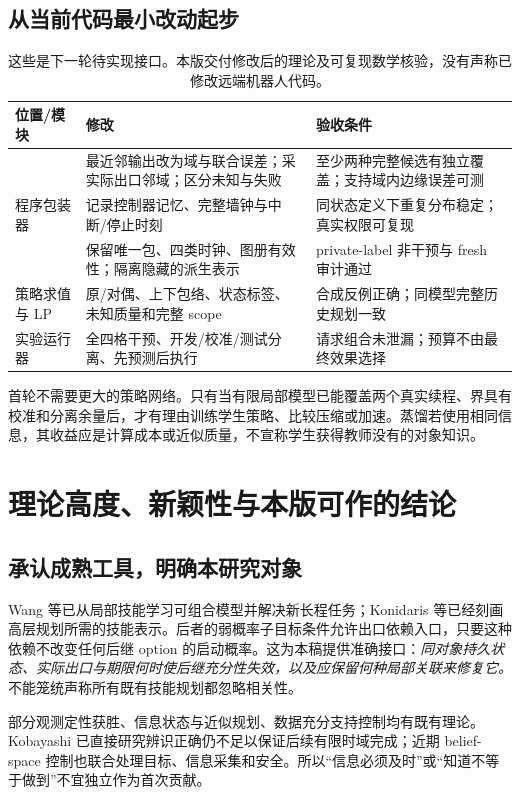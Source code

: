 \documentclass[11pt,a4paper,fontset=fandol]{ctexart}
\theoremstyle{definition}
\theoremstyle{remark}\newtheorem{remark}[theorem]{说明}
\numberwithin{equation}{section}
\begin{document}
\subsection{从当前代码最小改动起步}
\begin{table}[htbp]\centering\small
\begin{tabularx}{\linewidth}{P{.24\linewidth}YY}\toprule
位置/模块 & 修改 & 验收条件\\\midrule
{} & 最近邻输出改为域与联合误差；采实际出口邻域；区分未知与失败 & 至少两种完整候选有独立覆盖；支持域内边缘误差可测\\
程序包装器 & 记录控制器记忆、完整墙钟与中断/停止时刻 & 同状态定义下重复分布稳定；真实权限可复现\\
 & 保留唯一包、四类时钟、图册有效性；隔离隐藏的派生表示 & private-label 非干预与 fresh 审计通过\\
策略求值与 LP & 原/对偶、上下包络、状态标签、未知质量和完整 scope & 合成反例正确；同模型完整历史规划一致\\
实验运行器 & 全四格干预、开发/校准/测试分离、先预测后执行 & 请求组合未泄漏；预算不由最终效果选择\\\bottomrule
\end{tabularx}
\caption{这些是下一轮待实现接口。本版交付修改后的理论及可复现数学核验，没有声称已修改远端机器人代码。}
\end{table}

首轮不需要更大的策略网络。只有当有限局部模型已能覆盖两个真实续程、界具有校准和分离余量后，才有理由训练学生策略、比较压缩或加速。蒸馏若使用相同信息，其收益应是计算成本或近似质量，不宣称学生获得教师没有的对象知识。

\section{理论高度、新颖性与本版可作的结论}
\label{sec:novelty}
\subsection{承认成熟工具，明确本研究对象}
Wang 等已从局部技能学习可组合模型并解决新长程任务\cite{skills}；Konidaris 等已经刻画高层规划所需的技能表示\cite{symbols}。后者的弱概率子目标条件允许出口依赖入口，只要这种依赖不改变任何后继 option 的启动概率。这为本稿提供准确接口：\emph{同对象持久状态、实际出口与期限何时使后继充分性失效，以及应保留何种局部关联来修复它。}不能笼统声称所有既有技能规划都忽略相关性。

部分观测定性获胜、信息状态与近似规划、数据充分支持控制均有既有理论\cite{qualitative,ais,informativity}。Kobayashi 已直接研究辨识正确仍不足以保证后续有限时域完成\cite{kobayashi}；近期 belief-space 控制也联合处理目标、信息采集和安全\cite{beliefcontrol}。所以“信息必须及时”或“知道不等于做到”不宜独立作为首次贡献。
\end{document}
